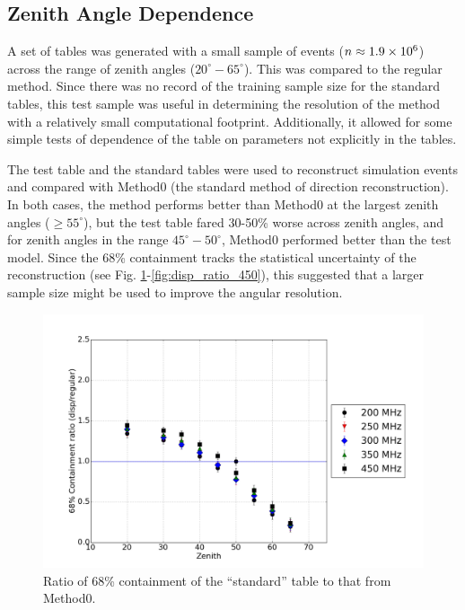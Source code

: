 \documentclass[main.tex]{subfiles}
\begin{document}
\subsection{Zenith Angle Dependence}
A set of \disp tables was generated with a small sample of events ($n\approx 1.9\times 10^{6}$) across the range of zenith angles ($20^\circ-65^\circ$). This was compared to the regular \disp method. Since there was no record of the training sample size for the standard tables, this test sample was useful in determining the resolution of the \disp method with a relatively small computational footprint. Additionally, it allowed for some simple tests of dependence of the \disp table on parameters not explicitly in the \disp tables.

The test \disp table and the standard \disp tables were used to reconstruct simulation events and compared with Method0 (the standard method of direction reconstruction). In both cases, the \disp method performs better than Method0 at the largest zenith angles ($\geq 55^\circ$), but the test \disp table fared 30-50\% worse across zenith angles, and for zenith angles in the range $45^\circ-50^\circ$, Method0 performed better than the test model. Since the 68\% containment tracks the statistical uncertainty of the \disp reconstruction (see Fig. \ref{fig:olddisp_ratio}-\ref{fig:disp_ratio_450}), this suggested that a larger sample size might be used to improve the angular resolution.

\begin{figure}[htbp]
  \begin{center}
      \includegraphics[width=0.8\linewidth]{images/disp_standard_ratio_xzen}
      \caption[``standard'' \disp table reconstruction.]{Ratio of 68\% containment of the ``standard'' \disp table to that from Method0.}  
      \label{fig:olddisp_ratio}
  \end{center}
\end{figure}
\end{document}
